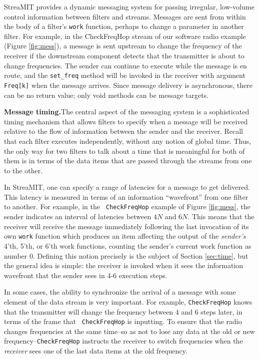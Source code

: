 StreaMIT provides a dynamic messaging system for passing irregular,
low-volume control information between filters and streams.  Messages
are sent from within the body of a filter's {\tt work} function,
perhaps to change a parameter in another filter.  For example, in the
CheckFreqHop stream of our software radio example (Figure
\ref{fig:mess}), a message is sent upstream to change the frequency of
the receiver if the downstream component detects that the transmitter
is about to change frequencies.  The sender can continue to execute
while the message is en route, and the {\tt set\_freq} method will be
invoked in the receiver with argument {\tt Freq[k]} when the message
arrives.  Since message delivery is asynchronous, there can be no
return value; only void methods can be message targets.

{\bf Message timing.}The central aspect of the messaging system is a
sophisticated timing mechanism that allows filters to specify when a
message will be received relative to the flow of information between
the sender and the receiver.  Recall that each filter executes
independently, without any notion of global time.  Thus, the only way
for two filters to talk about a time that is meaningful for both of
them is in terms of the data items that are passed through the streams
from one to the other.

In StreaMIT, one can specify a range of latencies for a message to get
delivered.  This latency is measured in terms of an information
``wavefront'' from one filter to another.  For example, in the {\tt
CheckFreqHop} example of Figure \ref{fig:mess}, the sender indicates
an interval of latencies between $4N$ and $6N$.  This means that the
receiver will receive the message immediately following the last
invocation of its own {\tt work} function which produces an item
affecting the output of the {\it sender's} 4'th, 5'th, or 6'th work
functions, counting the sender's current work function as number 0.
Defining this notion precisely is the subject of Section
\ref{sec:time}, but the general idea is simple:  the receiver is
invoked when it sees the information wavefront that the sender sees in
4-6 execution steps.  

In some cases, the ability to synchronize the arrival of a message
with some element of the data stream is very important.  For example,
{\tt CheckFreqHop} knows that the transmitter will change the
frequency between 4 and 6 steps later, in terms of the frame that {\tt
CheckFreqHop} is inputting.  To ensure that the radio changes
frequencies at the same time--so as not to lose any data at the old or
new frequency--{\tt CheckFreqHop} instructs the receiver to switch
frequencies when the {\it receiver} sees one of the last data items at
the old frequency.

